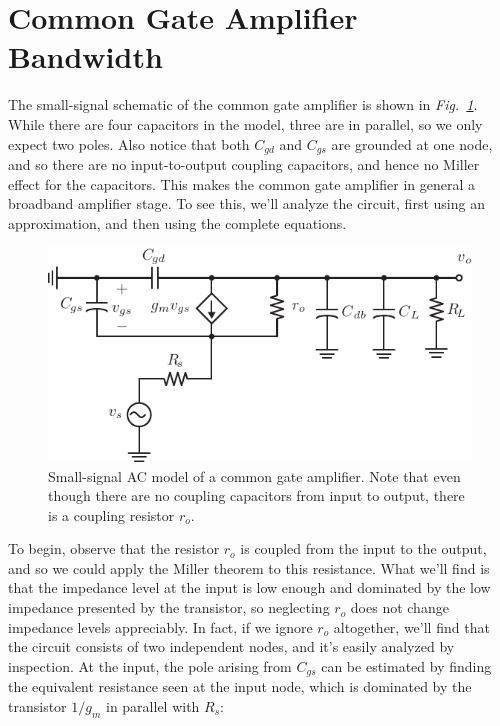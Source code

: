 \section{Common Gate Amplifier Bandwidth}
The small-signal schematic of the common gate amplifier is shown in \emph{Fig.~\ref{fig:cg_amp_caps}}. While there are four capacitors in the model, three are in parallel, so we only expect two poles.  Also notice that both $C_{gd}$ and $C_{gs}$ are grounded at one node, and so there are no input-to-output coupling capacitors, and hence no Miller effect for the capacitors.  This makes the common gate amplifier in general a broadband amplifier stage.  To see this, we'll analyze the circuit, first using an approximation, and then using the complete equations.  
\begin{figure}[tb]
\centering
\includegraphics[scale=1]{amp_cg_ss}
\caption{Small-signal AC model of a common gate amplifier.  Note that even though there are no coupling capacitors from input to output, there is a coupling resistor $r_o$.}
\label{fig:cg_amp_caps}
\end{figure}
To begin, observe that the resistor $r_o$ is coupled from the input to the output, and so we could apply the Miller theorem to this resistance.  What we'll find is that the impedance level at the input is low enough and dominated by the low impedance presented by the transistor, so neglecting $r_o$ does not change impedance levels appreciably.  In fact, if we ignore $r_o$ altogether, we'll find that the circuit consists of two independent nodes, and it's easily analyzed by inspection.
At the input, the pole arising from $C_{gs}$ can be estimated by finding the equivalent resistance seen at the input node, which is dominated by the transistor $1/g_m$ in parallel with $R_s$:
